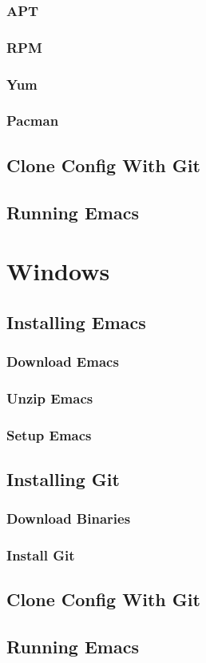 \documentclass[a4paper]{article}
\begin{document}
\subsubsection*{APT}
\subsubsection*{RPM}
\subsubsection*{Yum}
\subsubsection*{Pacman}

\subsection{Clone Config With Git}
\subsection{Running Emacs}



\section{Windows}
\subsection{Installing Emacs}
\subsubsection*{Download Emacs}
\subsubsection*{Unzip Emacs}
\subsubsection*{Setup Emacs}

\subsection{Installing Git}
\subsubsection{Download Binaries}
\subsubsection{Install Git}

\subsection{Clone Config With Git}
\subsection{Running Emacs}



\end{document}
